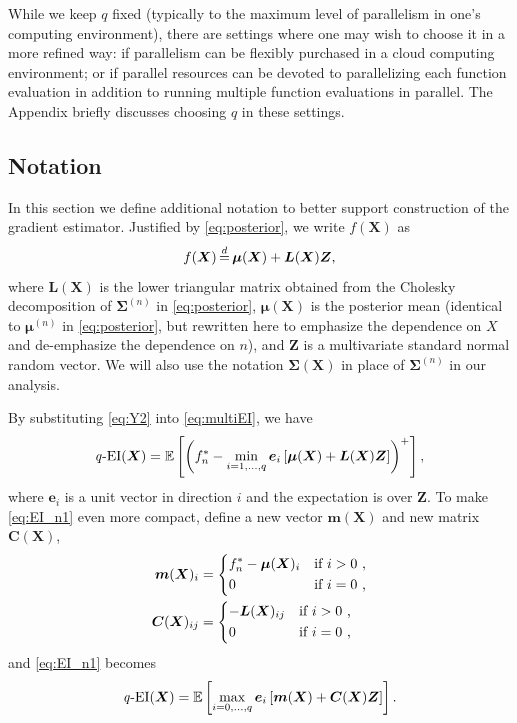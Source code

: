 \documentclass[paper=letter]{scrartcl}
\newcommand{\bmu}[1]{\bm{\mu}^{(#1)}}
\newcommand{\Sig}[1]{\bm{\Sigma}^{(#1)}} %
\newcommand{\qEI}{\text{\textit q-EI}}
\begin{document}
While we keep $q$ fixed (typically to the maximum level of parallelism in one's computing environment), there are settings where one may wish to choose it in a more refined way: 
if parallelism can be flexibly purchased in a cloud computing environment; or if parallel resources can be devoted to parallelizing each function evaluation in addition to running multiple function evaluations in parallel. The Appendix briefly discusses choosing $q$ in these settings.

\subsection{Notation}
\label{sec:notation}
In this section we define additional notation to better support construction of the gradient estimator.
Justified by \eqref{eq:posterior}, we 
write $f(\bm{X})$ as
\begin{equation} 
f(\bm{X}) \,{\buildrel d \over =}\, \bm{\mu}(\bm{X}) +\bm{L}(\bm{X}) \bm{Z},
\label{eq:Y2}
\end{equation}
where $\bm{L}(\bm{X})$ is the lower triangular matrix obtained from the Cholesky decomposition of $\Sig{n}$
in \eqref{eq:posterior}, $\bm{\mu}(\bm{X})$ is the posterior mean (identical to $\bmu{n}$ in \eqref{eq:posterior}, but rewritten here to emphasize the dependence on $X$ and de-emphasize the dependence on $n$),
and $\bm{Z}$ is a multivariate standard normal random vector. 
We will also use the notation $\bm{\Sigma}(\bm{X})$ in place of $\bm{\Sigma}^{(n)}$ in our analysis.


By substituting \eqref{eq:Y2} into \eqref{eq:multiEI}, we have
\begin{equation}
  \qEI (\bm{X}) =\mathbb{E} \left[\left( f_n^* - \min_{i=1,\ldots,q} \bm{e}_i \left[ \bm{\mu}(\bm{X})+\bm{L}(\bm{X}) \bm{Z} \right] \right)^+ \right],
  \label{eq:EI_n1}
\end{equation}
where $\bm{e}_i$ is a unit vector in direction $i$ and the expectation is over $\bm{Z}$. To make \eqref{eq:EI_n1} even more compact, define a new vector $\bm{m}(\bm{X})$
and new matrix $\bm{C}(\bm{X})$, 
\begin{equation}
\begin{split}
  \bm{m}(\bm{X})_i&=
\begin{dcases}
  f_n^* - \bm{\mu}(\bm{X})_i  & \text{if $i>0$ ,} \\
0 & \text{if $i=0$ ,}
\end{dcases}
\\
\bm{C}(\bm{X})_{ij} &=\begin{dcases}
-\bm{L}(\bm{X})_{ij} & \text{if $i>0$ ,} \\
0       & \text{if $i=0$ ,}
\end{dcases}
\end{split}
\label{eq:multiEI_detail}
\end{equation}
and \eqref{eq:EI_n1} becomes
\begin{equation} \label{eq:qEI}
\qEI(\bm{X}) = \mathbb{E} \left[ \max_{i=0,\ldots,q} \bm{e}_i \left[ \bm{m}(\bm{X}) +\bm{C}(\bm{X}) \bm{Z} \right] \right].
\end{equation}
\end{document}
